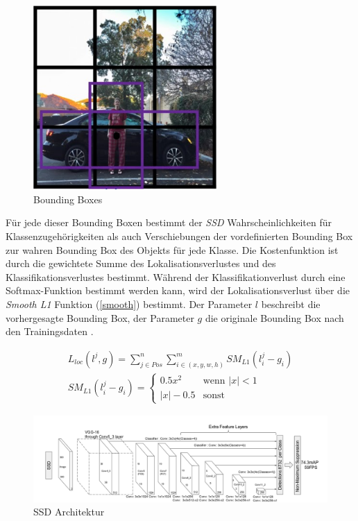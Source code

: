 \begin{figure}[ht]
	\begin{center}
		\includegraphics[width=7cm]{Bilder/bounding_boxes.png} 
		\caption[Bounding Boxes]{Bounding Boxes \cite{AndrewNg.2019}}
		\label{boundingboxes}
	\end{center}
\end{figure}

Für jede dieser Bounding Boxen bestimmt der \textit{SSD} Wahrscheinlichkeiten für Klassenzugehörigkeiten als auch Verschiebungen der vordefinierten Bounding Box zur wahren Bounding Box des Objekts für jede Klasse. Die Kostenfunktion ist durch die gewichtete Summe des Lokalisationsverlustes und des Klassifikationsverlustes bestimmt. Während der Klassifikationverlust durch eine Softmax-Funktion bestimmt werden kann, wird der Lokalisationsverlust über die \textit{Smooth L1} Funktion (\ref{smooth}) bestimmt. Der Parameter $l$ beschreibt die vorhergesagte Bounding Box, der Parameter $g$ die originale Bounding Box nach den Trainingsdaten \cite{ssd.20161229}.

\begin{equation}\label{smooth}
\begin{split}
L_{loc}(l^j,g) = \sum\limits_{j \in Pos}^{n} \sum\limits_{i \in (x,y,w,h)}^{m} SM_{L1}(l^j_i - g_i) \\
SM_{L1}(l^j_i - g_i) = \begin{cases}
							0.5x^2      & \text{wenn } |x| < 1\\
							|x| - 0.5   & \text{sonst}
						   \end{cases}
\end{split}
\end{equation}

\begin{figure}[ht]
	\begin{center}
		\includegraphics[width=15cm]{Bilder/ssd_architecture.png} 
		\caption[SSD Architektur]{SSD Architektur \cite{ssd.20161229}}
		\label{architecture}
	\end{center}
\end{figure}

